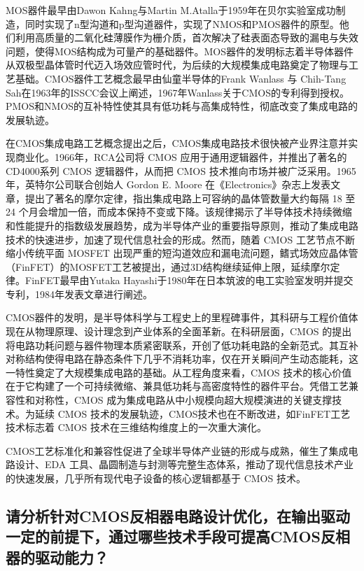 \documentclass[12pt,a4paper]{ctexart}
\begin{document}
MOS器件最早由Dawon Kahng与Martin M.Atalla于1959年在贝尔实验室成功制造\cite{mos,mos_patent}，同时实现了n型沟道和p型沟道器件，实现了NMOS和PMOS器件的原型。他们利用高质量的二氧化硅薄膜作为栅介质，首次解决了硅表面态导致的漏电与失效问题，使得MOS结构成为可量产的基础器件。MOS器件的发明标志着半导体器件从双极型晶体管时代迈入场效应管时代，为后续的大规模集成电路奠定了物理与工艺基础。CMOS器件工艺概念最早由仙童半导体的Frank Wanlass 与 Chih-Tang Sah在1963年的ISSCC会议上阐述\cite{cmos}，1967年Wanlass关于CMOS的专利得到授权\cite{cmos_patent}。PMOS和NMOS的互补特性使其具有低功耗与高集成特性，彻底改变了集成电路的发展轨迹。

在CMOS集成电路工艺概念提出之后，CMOS集成电路技术很快被产业界注意并实现商业化。1966年，RCA公司将 CMOS 应用于通用逻辑器件，并推出了著名的 CD4000系列 CMOS 逻辑器件，从而把 CMOS 技术推向市场并被广泛采用。1965年，英特尔公司联合创始人 Gordon E. Moore 在《Electronics》杂志上发表文章\cite{moore}，提出了著名的摩尔定律，指出集成电路上可容纳的晶体管数量大约每隔 18 至 24 个月会增加一倍，而成本保持不变或下降。该规律揭示了半导体技术持续微缩和性能提升的指数级发展趋势，成为半导体产业的重要指导原则，推动了集成电路技术的快速进步，加速了现代信息社会的形成。然而，随着 CMOS 工艺节点不断缩小传统平面 MOSFET 出现严重的短沟道效应和漏电流问题，鳍式场效应晶体管（FinFET）的MOSFET工艺被提出，通过3D结构继续延伸上限，延续摩尔定律。FinFET最早由Yutaka Hayashi于1980年在日本筑波的电工实验室发明并提交专利，1984年发表文章\cite{finfet}进行阐述。

CMOS器件的发明，是半导体科学与工程史上的里程碑事件，其科研与工程价值体现在从物理原理、设计理念到产业体系的全面革新。在科研层面，CMOS 的提出将电路功耗问题与器件物理本质紧密联系，开创了低功耗电路的全新范式。其互补对称结构使得电路在静态条件下几乎不消耗功率，仅在开关瞬间产生动态能耗，这一特性奠定了大规模集成电路的基础。从工程角度来看，CMOS 技术的核心价值在于它构建了一个可持续微缩、兼具低功耗与高密度特性的器件平台。凭借工艺兼容性和对称性，CMOS 成为集成电路从中小规模向超大规模演进的关键支撑技术。为延续 CMOS 技术的发展轨迹，CMOS技术也在不断改进，如FinFET工艺技术标志着 CMOS 技术在三维结构维度上的一次重大演化。

CMOS工艺标准化和兼容性促进了全球半导体产业链的形成与成熟，催生了集成电路设计、EDA 工具、晶圆制造与封测等完整生态体系，推动了现代信息技术产业的快速发展，几乎所有现代电子设备的核心逻辑都基于 CMOS 技术。

\subsection{请分析针对CMOS反相器电路设计优化，在输出驱动一定的前提下，通过哪些技术手段可提高CMOS反相器的驱动能力？ }
\end{document}
